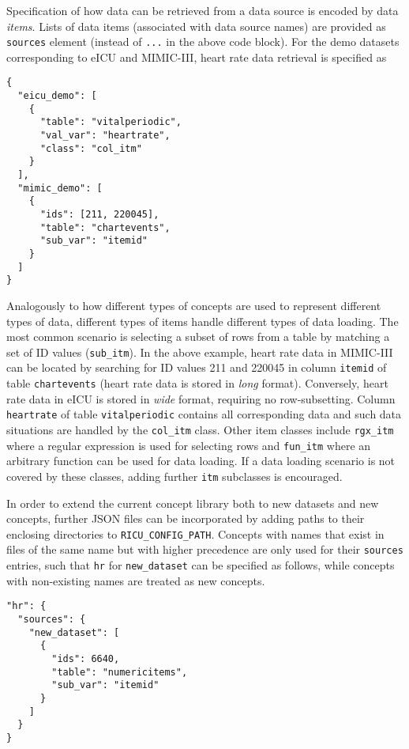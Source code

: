 \documentclass[
  notitle]{jss}
\begin{document}
Specification of how data can be retrieved from a data source is encoded
by data \emph{items}. Lists of data items (associated with data source
names) are provided as \texttt{sources} element (instead of \texttt{...}
in the above code block). For the demo datasets corresponding to eICU
and MIMIC-III, heart rate data retrieval is specified as

\begin{verbatim}
{
  "eicu_demo": [
    {
      "table": "vitalperiodic",
      "val_var": "heartrate",
      "class": "col_itm"
    }
  ],
  "mimic_demo": [
    {
      "ids": [211, 220045],
      "table": "chartevents",
      "sub_var": "itemid"
    }
  ]
}
\end{verbatim}

Analogously to how different types of concepts are used to represent
different types of data, different types of items handle different types
of data loading. The most common scenario is selecting a subset of rows
from a table by matching a set of ID values (\texttt{sub\_itm}). In the
above example, heart rate data in MIMIC-III can be located by searching
for ID values 211 and 220045 in column \texttt{itemid} of table
\texttt{chartevents} (heart rate data is stored in \emph{long} format).
Conversely, heart rate data in eICU is stored in \emph{wide} format,
requiring no row-subsetting. Column \texttt{heartrate} of table
\texttt{vitalperiodic} contains all corresponding data and such data
situations are handled by the \texttt{col\_itm} class. Other item
classes include \texttt{rgx\_itm} where a regular expression is used for
selecting rows and \texttt{fun\_itm} where an arbitrary function can be
used for data loading. If a data loading scenario is not covered by
these classes, adding further \texttt{itm} subclasses is encouraged.

In order to extend the current concept library both to new datasets and
new concepts, further JSON files can be incorporated by adding paths to
their enclosing directories to \texttt{RICU\_CONFIG\_PATH}. Concepts
with names that exist in files of the same name but with higher
precedence are only used for their \texttt{sources} entries, such that
\texttt{hr} for \texttt{new\_dataset} can be specified as follows, while
concepts with non-existing names are treated as new concepts.

\begin{verbatim}
"hr": {
  "sources": {
    "new_dataset": [
      {
        "ids": 6640,
        "table": "numericitems",
        "sub_var": "itemid"
      }
    ]
  }
}
\end{verbatim}
\end{document}
